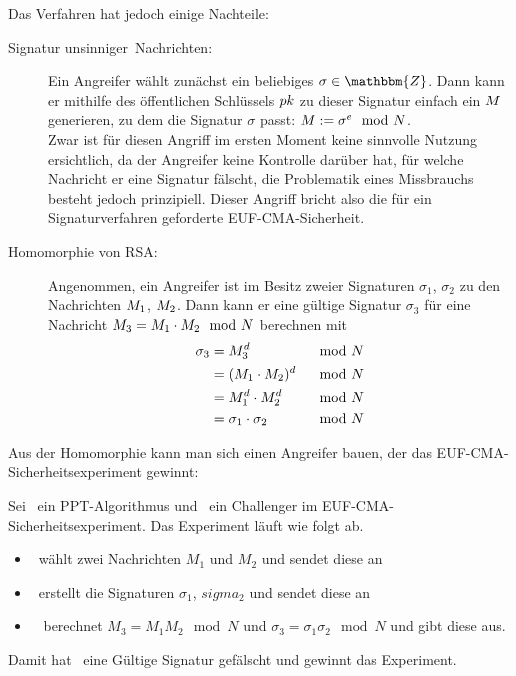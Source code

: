 Das Verfahren hat jedoch einige Nachteile:
\begin{description}
    \item[Signatur \glqq unsinniger\grqq~Nachrichten:] Ein Angreifer
      wählt zunächst ein beliebiges $\sigma \in \mathbbm{Z}$. Dann kann
      er mithilfe des öffentlichen Schlüssels $pk$ zu dieser Signatur
      einfach ein $M$ generieren, zu dem die Signatur $\sigma$
      passt: $M := \sigma^e \mod N$.\\ 
    Zwar ist für diesen Angriff im ersten Moment keine sinnvolle Nutzung
    ersichtlich, da der Angreifer keine Kontrolle darüber hat, für
    welche Nachricht er eine Signatur fälscht, die Problematik eines
    Missbrauchs besteht jedoch prinzipiell. Dieser Angriff bricht also
    die für ein Signaturverfahren geforderte EUF-CMA-Sicherheit.
  \item[Homomorphie von RSA:] Angenommen, ein Angreifer ist im Besitz
    zweier Signaturen $\sigma_1$, $\sigma_2$ zu den Nachrichten
    $M_1$, $M_2$. Dann kann er eine gültige Signatur
    $\sigma_3$ für
    eine Nachricht $M_3 = M_1 \cdot M_2 \mod N$
    berechnen mit
    \begin{alignat}{2}
      \sigma_3 &= M_3^d  & \mod N\\
               &=  (M_1 \cdot M_2)^d & \mod N \\
               &= M_1^d \cdot M_2^d &\mod N\\
               &= \sigma_1 \cdot \sigma_2 &\mod N\\ 
    \end{alignat}
  \end{description}
  Aus der Homomorphie kann man sich einen Angreifer bauen, der das
  EUF-CMA-Sicherheitsexperiment gewinnt: 
  \begin{beispiel}
    Sei \A~ein PPT-Algorithmus und \C~ein Challenger im
    EUF-CMA-Sicherheitsexperiment. Das Experiment läuft wie folgt ab.
    \begin{itemize}
    \item \A~wählt zwei Nachrichten $M_1$ und $M_2$ und sendet diese an
      \C
    \item \C~erstellt die Signaturen $\sigma_1$, $sigma_2$ und sendet
      diese an \A
    \item \A~ berechnet $M_3=M_1M_2 \mod N$ und
      $\sigma_3=\sigma_1\sigma_2 \mod N$ und gibt diese aus.
    \end{itemize}
    Damit hat \A~eine Gültige Signatur gefälscht und gewinnt das Experiment.
  \end{beispiel}
